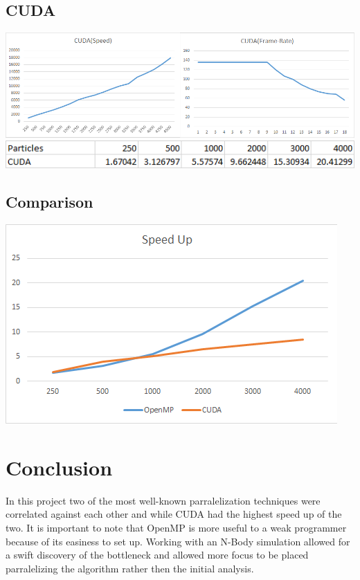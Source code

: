 \documentclass[12pt]{article}
\begin{document}
\subsection{CUDA}
\newline
\includegraphics[scale=0.5]{pics/cudatest.png}
\newline
\includegraphics[scale=0.7]{pics/cudaspeedup.png}
\newline
\subsection{Comparison}
\includegraphics[scale=0.75]{pics/finalspeedup.png}
\newline
\section{Conclusion}
In this project two of the most well-known parralelization techniques were correlated
against each other and while CUDA had the highest speed up of the two. It is important to note that OpenMP is more useful to a weak programmer because of its  easiness to set up. Working with an N-Body simulation allowed for a swift discovery of the bottleneck and allowed more focus to be placed parralelizing the algorithm rather then the initial analysis. 
\end{document}
